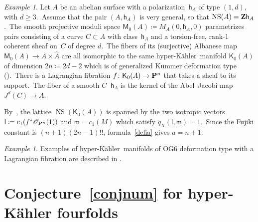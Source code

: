 \documentclass[12pt]{amsart}
\def\cO{\mathscr{O}}
\def\Z{{\bf Z}}
\def\P{{\bf P}}
\DeclareMathOperator{\NS}{NS}
\DeclareMathOperator{\num}{\underset{\mathrm num}{\equiv}}
\def\hk{hyper-K\"ahler}
\theoremstyle{remark}
\newtheorem{exam}[lemm]{Example}
\def\hh{\ensuremath{\mathsf h}}
\def\lll{\ensuremath{\mathsf l}}
\def\mm{\ensuremath{\mathsf m}}
\def\M{\ensuremath{\mathsf M}}
\def\K{\ensuremath{\mathsf K}}
\begin{document}
\begin{exam}\label{ex:Kumn}
 Let $A$ be an abelian surface with a polarization~$\hh_A$ of type $(1,d)$, with $ d\ge 3$.\
Assume that the pair $(A,\hh_A)$ is very general, so that $\NS(A)=\Z \hh_A$.\
The smooth projective moduli space  $\M_0(A)\coloneqq M_{A}(0,\hh_A,0)$ parametrizes pairs consisting of a curve $C\subset A$ with class~$\hh_A$ and a torsion-free, rank-1 coherent sheaf on~$C$ of degree $d$.\
The fibers of its (surjective) Albanese map $\M_0(A)\to A\times \widehat A$   are all isomorphic to the same \hk\ manifold $\K_0(A)$ of dimension $2n\coloneqq 2d-2$ which is of generalized Kummer deformation type (\cite[Theorem~0.2(1)]{yos:moduli}).\
There is a Lagrangian fibration
$
f\colon \K_0(A) \to \P^{n}
$
that takes a sheaf to its support.\
The fiber of a smooth $C\num \hh_A$ is the kernel of the Abel--Jacobi map $J^{d}(C)\to A$.\

By~\cite[Theorem 0.2(2)]{yos:moduli}, the lattice $\NS(\K_0(A))$ is spanned by the two isotropic vectors $\lll\coloneqq c_1(f^*\cO_{\P^{n}}(1))$ and $  \mm=c_1(M)$ which satisfy $q_X(\lll, \mm)=1$.\
Since the Fujiki constant is $(n+1) (2n-1)!!$, formula~\eqref{defia} gives $a=n+1$.
\end{exam}

\begin{exam}
Examples of \hk\ manifolds of  OG6 deformation type with a Lagrangian fibration are described in \cite{rap}.
\end{exam}



\section{Conjecture~\ref{conjnum} for hyper-K\"ahler fourfolds}\label{sec:IsotropicClasses}
\end{document}
